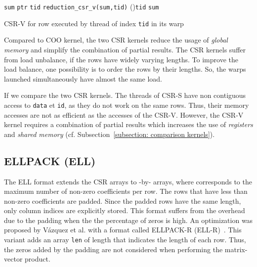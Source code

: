 \documentclass[runningheads,orivec]{llncs}
\begin{document}
\begin{algorithm}[]
 \BlankLine
 \small 
 \texttt{sum} \;
  \texttt{ptr}\textsubscript{}  \texttt{tid}
   \texttt{reduction\_csr\_v(sum,tid)}
  \If(){\texttt{\upshape tid}}{
  	  \texttt{sum}\;
  } 
 \caption{\small CSR-V for row  executed by thread of index \texttt{tid} in its warp}
\label{Kernel::CSR}

\end{algorithm}




Compared to COO kernel, the two CSR kernels reduce the usage of \textit{global memory} and simplify the combination of partial results. The CSR kernels suffer from load unbalance, if the rows have widely varying lengths. To improve the load balance, one possibility is to order the rows by their lengths. So, the warps launched simultaneously have almost the same load.

If we compare the two CSR kernels. The threads of CSR-S have non contiguous access to \texttt{data} et \texttt{id}, as they do not work on the same rows. Thus, their memory accesses are not as efficient as the accesses of the CSR-V. However, the CSR-V kernel requires a combination of partial results which increases the use of \textit{registers} and \textit{shared memory} (cf. Subsection~\ref{subsection: comparison kernels}).

\vspace*{-0.25cm}

\subsection*{ELLPACK (ELL)}
\vspace*{-0.25cm}

The ELL format extends the CSR arrays to -by- arrays, where  corresponds to the maximum number of non-zero coefficients per row. The rows that have less than  non-zero coefficients are padded. Since the padded rows have the same length, only column indices are explicitly stored. This format suffers from the overhead due to the padding when the the percentage of zeros is high. An optimization was proposed by V\'{a}zquez et al. with a format called ELLPACK-R (ELL-R)~\cite{VAZQ09}. This variant adds an array \texttt{len} of length  that indicates the length of each row. Thus, the zeros added by the padding are not considered when performing the matrix-vector product.
\end{document}
